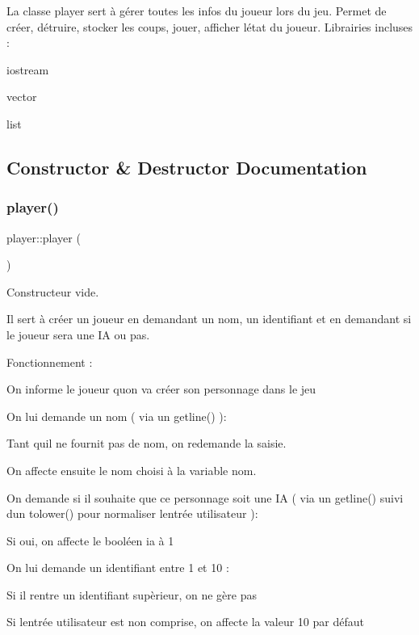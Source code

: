 La classe player sert à gérer toutes les infos du joueur lors du jeu. Permet de créer, détruire, stocker les coups, jouer, afficher l\textquotesingle{}état du joueur. Librairies incluses \+:
\begin{DoxyItemize}
\item iostream
\item vector
\item list 
\end{DoxyItemize}

\subsection{Constructor \& Destructor Documentation}
\mbox{\label{classplayer_a97de83bce15f880241f561b55b016b02}} 
\subsubsection{\texorpdfstring{player()}{player()}}
{\footnotesize\ttfamily player\+::player (\begin{DoxyParamCaption}{ }\end{DoxyParamCaption})}



Constructeur vide. 

Il sert à créer un joueur en demandant un nom, un identifiant et en demandant si le joueur sera une IA ou pas.

Fonctionnement \+:
\begin{DoxyEnumerate}
\item On informe le joueur qu\textquotesingle{}on va créer son personnage dans le jeu
\item On lui demande un nom ( via un getline() )\+:
\begin{DoxyItemize}
\item Tant qu\textquotesingle{}il ne fournit pas de nom, on redemande la saisie.
\item On affecte ensuite le nom choisi à la variable nom.
\end{DoxyItemize}
\item On demande si il souhaite que ce personnage soit une IA ( via un getline() suivi d\textquotesingle{}un tolower() pour normaliser l\textquotesingle{}entrée utilisateur )\+:
\begin{DoxyItemize}
\item Si oui, on affecte le booléen ia à 1
\end{DoxyItemize}
\item On lui demande un identifiant entre 1 et 10 \+:
\begin{DoxyItemize}
\item Si il rentre un identifiant supèrieur, on ne gère pas
\item Si l\textquotesingle{}entrée utilisateur est non comprise, on affecte la valeur 10 par défaut 
\end{DoxyItemize}
\end{DoxyEnumerate}\mbox{\label{classplayer_aab5d2e47b80e0481f09ca0df8b823057}} 
